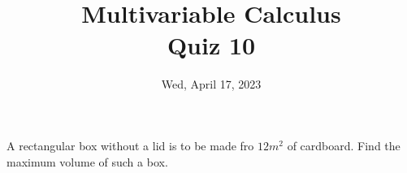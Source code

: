 \documentclass[aspectratio=169]{beamer}
\title{ Multivariable Calculus \\ Quiz 10}
\institute{Fulbright University Vietnam}
\date{Wed, April 17, 2023}
\begin{document}
\maketitle

\begin{frame}

	A rectangular box without a lid is to be made fro $12m^2$ of
	cardboard. Find the maximum volume of such a box.

\end{frame}
\end{document}
